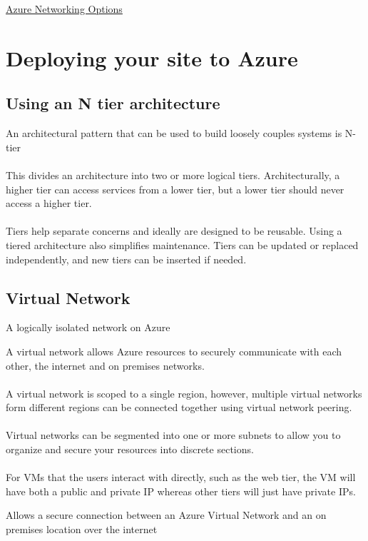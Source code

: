 \documentclass{article}[18pt]
\begin{document}
\begin{center}
\underline{\huge Azure Networking Options}
\end{center}
\section{Deploying your site to Azure}
\subsection{Using an N tier architecture}
An architectural pattern that can be used to build loosely couples systems is N-tier\\
\\
This divides an architecture into two or more logical tiers. Architecturally, a higher tier can access services from a lower tier, but a lower tier should never access a higher tier.\\
\\
Tiers help separate concerns and ideally are designed to be reusable. Using a tiered architecture also simplifies maintenance. Tiers can be updated or replaced independently, and new tiers can be inserted if needed.
\subsection{Virtual Network}
\begin{definition}
	A logically isolated network on Azure
\end{definition}
A virtual network allows Azure resources to securely communicate with each other, the internet and on premises networks.\\
\\
A virtual network is scoped to a single region, however, multiple virtual networks form different regions can be connected together using virtual network peering. \\
\\
Virtual networks can be segmented into one or more subnets to allow you to organize and secure your resources into discrete sections.\\
\\
For VMs that the users interact with directly, such as the web tier, the VM will have both a public and private IP whereas other tiers will just have private IPs.
\begin{definition}
	Allows a secure connection between an Azure Virtual Network and an on premises location over the internet
\end{definition}
\end{document}
